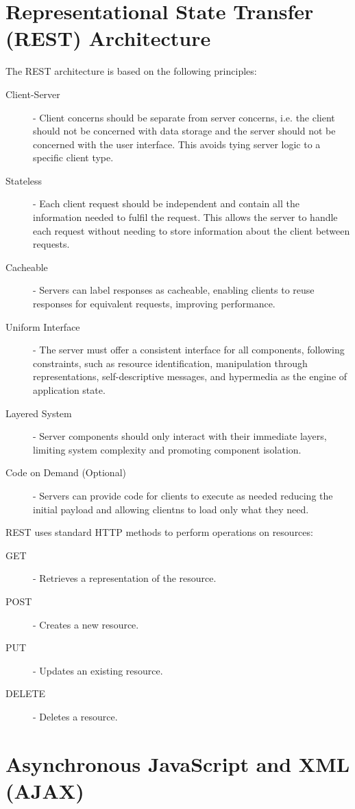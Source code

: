 \documentclass[12pt letter]{report}
\begin{document}
\section{Representational State Transfer (REST) Architecture}


The REST architecture is based on the following principles:
\begin{description}
  \item[Client-Server]  - Client concerns should be separate from server concerns, i.e. the client should not be
        concerned with data storage and the server should not be concerned with the user interface. This avoids tying
        server logic to a specific client type.
  \item[Stateless]  - Each client request should be independent and contain all the information needed to fulfil the
        request. This allows the server to handle each request without needing to store information about the client between requests.
  \item[Cacheable] - Servers can label responses as cacheable, enabling clients to reuse responses for equivalent
        requests, improving performance.
  \item[Uniform Interface] - The server must offer a consistent interface for all components, following constraints,
        such as resource identification, manipulation through representations, self-descriptive messages, and hypermedia as the engine of application state.
  \item[Layered System] - Server components should only interact with their immediate layers, limiting system
        complexity and promoting component isolation.
  \item[Code on Demand (Optional)] - Servers can provide code for clients to execute as needed reducing the initial
        payload and allowing clientns to load only what they need.
\end{description}

REST uses standard HTTP methods to perform operations on resources:
\begin{description}
  \item[GET] - Retrieves a representation of the resource.
  \item[POST] - Creates a new resource.
  \item[PUT] - Updates an existing resource.
  \item[DELETE] - Deletes a resource.
\end{description}

\section{Asynchronous JavaScript and XML (AJAX)}
\end{document}
